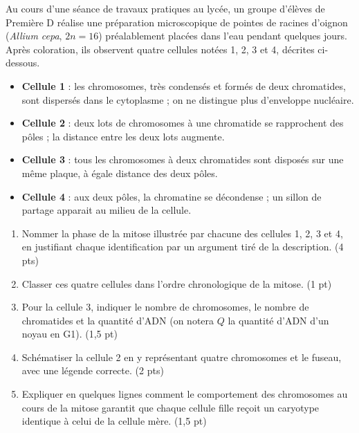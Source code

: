 \documentclass[11pt]{article}
\newcounter{popsec}
\newcounter{popsub}
\newcommand{\courssub}[1]{%
  \stepcounter{popsub}%
  \par\vspace{9pt}\noindent{\popxbold\fontsize{11.5}{13}\selectfont\color{popink}{\color{poporange}\thepopsec.\thepopsub}\hspace{6pt}#1}\par\nopagebreak\vspace{4pt}
}
\begin{document}
\courssub{Je me prépare au Probatoire}

\begin{exercice}
Au cours d'une séance de travaux pratiques au lycée, un groupe d'élèves de Première D réalise une préparation microscopique de pointes de racines d'oignon (\emph{Allium cepa}, $2n = 16$) préalablement placées dans l'eau pendant quelques jours. Après coloration, ils observent quatre cellules notées 1, 2, 3 et 4, décrites ci-dessous.
\begin{itemize}
\item \textbf{Cellule 1} : les chromosomes, très condensés et formés de deux chromatides, sont dispersés dans le cytoplasme ; on ne distingue plus d'enveloppe nucléaire.
\item \textbf{Cellule 2} : deux lots de chromosomes à une chromatide se rapprochent des pôles ; la distance entre les deux lots augmente.
\item \textbf{Cellule 3} : tous les chromosomes à deux chromatides sont disposés sur une même plaque, à égale distance des deux pôles.
\item \textbf{Cellule 4} : aux deux pôles, la chromatine se décondense ; un sillon de partage apparait au milieu de la cellule.
\end{itemize}
\begin{enumerate}
\item Nommer la phase de la mitose illustrée par chacune des cellules 1, 2, 3 et 4, en justifiant chaque identification par un argument tiré de la description. \hfill (4 pts)
\item Classer ces quatre cellules dans l'ordre chronologique de la mitose. \hfill (1 pt)
\item Pour la cellule 3, indiquer le nombre de chromosomes, le nombre de chromatides et la quantité d'ADN (on notera $Q$ la quantité d'ADN d'un noyau en G1). \hfill (1,5 pt)
\item Schématiser la cellule 2 en y représentant quatre chromosomes et le fuseau, avec une légende correcte. \hfill (2 pts)
\item Expliquer en quelques lignes comment le comportement des chromosomes au cours de la mitose garantit que chaque cellule fille reçoit un caryotype identique à celui de la cellule mère. \hfill (1,5 pt)
\end{enumerate}
\end{exercice}
\end{document}
